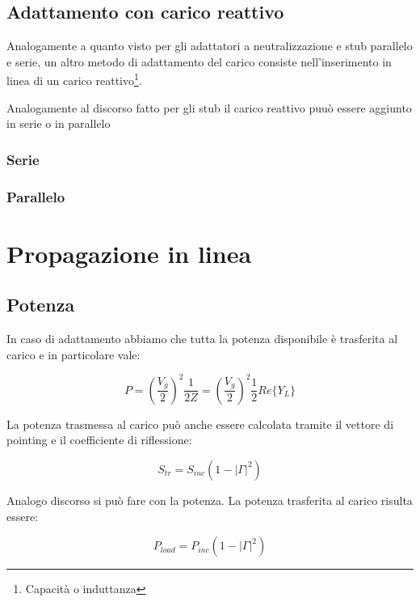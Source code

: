 \documentclass[10pt,a4paper]{report}
\begin{document}
	\section{Adattamento con carico reattivo}

		Analogamente a quanto visto per gli adattatori a neutralizzazione e stub parallelo e serie, un altro metodo di adattamento del carico consiste nell'inserimento in linea di un carico reattivo\footnote{Capacità o induttanza}.

		Analogamente al discorso fatto per gli stub il carico reattivo puuò essere aggiunto in serie o in parallelo

		\subsection{Serie}

		\subsection{Parallelo}

\chapter{Propagazione in linea}



	\section{Potenza}
		In caso di adattamento abbiamo che tutta la potenza disponibile è trasferita al carico e in particolare vale:
			
			\begin{equation}
			P=(\frac{V_g}{2})^2\frac{1}{2Z}=(\frac{V_g}{2})^2\frac{1}{2}Re\{Y_L\}
			\end{equation}

			La potenza trasmessa al carico può anche essere calcolata tramite il vettore di pointing e il coefficiente di riflessione:

			\begin{equation}
			S_{tr}=S_{inc}(1-|\Gamma|^2)
			\end{equation}

			Analogo discorso si può fare con la potenza.
			La potenza trasferita al carico risulta essere:

			\begin{equation}
			P_{load}=P_{inc}(1-|\Gamma|^2)
			\end{equation}
		
\end{document}
